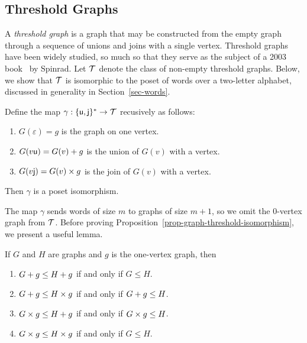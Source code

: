 \subsection{Threshold Graphs}

A \emph{threshold graph} is a graph that may be constructed from the empty graph through a sequence of unions and joins with a single vertex. Threshold graphs have been widely studied, so much so that they serve as the subject of a 2003 book~\cite{mahadev:threshold-graph:} by Spinrad. Let $\mathcal{T}$ denote the class of non-empty threshold graphs. Below, we show that $\mathcal{T}$ is isomorphic to the poset of words over a two-letter alphabet, discussed in generality in Section~\ref{sec-words}.

\begin{proposition}
\label{prop-graph-threshold-isomorphism}
	Define the map $\gamma: \{\textsf{u}, \textsf{j}\}^\ast \to \mathcal{T}$ recusively as follows:
	\begin{enumerate}
		\item $G(\varepsilon) = g$ is the graph on one vertex.
		\item $G(v\textsf{u}) = G(v) + g$ is the union of $G(v)$ with a vertex.
		\item $G(v\textsf{j}) = G(v) \times  g$ is the  join of $G(v)$ with a vertex.
	\end{enumerate}
	Then $\gamma$ is a poset isomorphism. 
\end{proposition}
The map $\gamma$ sends words of size $m$ to graphs of size $m+1$, so we omit the $0$-vertex graph from $\mathcal{T}$. Before proving Proposition~\ref{prop-graph-threshold-isomorphism}, we present a useful lemma.
\begin{lemma}
\label{lemma-graph-union}
	If $G$ and $H$ are graphs and $g$ is the one-vertex graph, then 
	\begin{enumerate}
		\item $G + g \le H + g$ if and only if $G \le H$.
		\item $G + g \le H \times  g$ if and only if $G + g \le H$.
		\item $G \times  g \le H + g$ if and only if $G \times  g \le H$.
		\item $G \times  g \le H \times  g$ if and only if $G \le H$.
	\end{enumerate}
\end{lemma}

